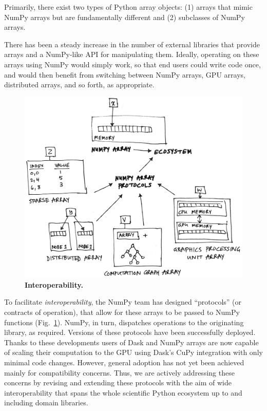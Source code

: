 Primarily, there
exist two types of Python array objects: (1) arrays that mimic NumPy arrays but are
fundamentally different and (2) subclasses of NumPy arrays.

There has been a steady increase in the number of external libraries that
provide arrays and a NumPy-like API for manipulating them.
Ideally, operating on these arrays using NumPy would simply work, so that end
users could write code once, and would then benefit from switching between
NumPy arrays, GPU arrays, distributed arrays, and so forth, as appropriate.

\begin{figure}
  \centering
  \includegraphics[width=.45\textwidth]{static/sketches/duck-arrays}
  \caption{\textbf{Interoperability.} }\label{fig:duck-arrays}
\end{figure}


To facilitate \emph{interoperability}, the NumPy team has designed
``protocols'' (or contracts of operation), that allow for these arrays to be
passed to NumPy functions (Fig.~\ref{fig:duck-arrays}).
NumPy, in turn, dispatches operations to the originating library, as required.
Versions of these protocols have been successfully deployed.
Thanks to these developments users of Dask and NumPy arrays are now capable
of scaling their computation to the GPU using Dask's CuPy integration with
only minimal code changes.
However, general adoption has not yet been achieved mainly for compatibility
concerns.
Thus, we are actively addressing these concerns by revising and extending
these protocols with the aim of wide interoperability that spans the whole
scientific Python ecosystem up to and including domain libraries.

